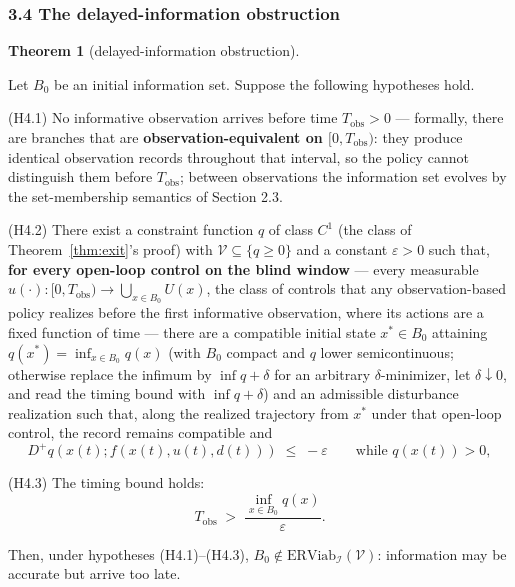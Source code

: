 \documentclass[11pt]{article}
\theoremstyle{definition}
\newtheorem{theorem}{Theorem}
\begin{document}
\subsubsection{3.4 The delayed-information
obstruction}\label{the-delayed-information-obstruction}

\begin{theorem}[delayed-information obstruction]\label{thm:delayed}

Let \(B_0\) be an initial information set. Suppose the following
hypotheses hold.

(H4.1) No informative observation arrives before time
\(T_{\mathrm{obs}} > 0\) --- formally, there are branches that are
\textbf{observation-equivalent on \([0, T_{\mathrm{obs}})\)}: they
produce identical observation records throughout that interval, so the
policy cannot distinguish them before \(T_{\mathrm{obs}}\); between
observations the information set evolves by the set-membership semantics
of Section 2.3.

(H4.2) There exist a constraint function \(q\) of class \(C^1\) (the
class of Theorem~\ref{thm:exit}'s proof) with \(\mathcal{V} \subseteq \{ q \ge 0 \}\)
and a constant \(\varepsilon > 0\) such that, \textbf{for every
open-loop control on the blind window} --- every measurable
\(u(\cdot) : [0, T_{\mathrm{obs}}) \to \bigcup_{x \in B_0} U(x)\), the
class of controls that any observation-based policy realizes before the
first informative observation, where its actions are a fixed function of
time --- there are a compatible initial state \(x^* \in B_0\) attaining
\(q(x^*) = \inf_{x \in B_0} q(x)\) (with \(B_0\) compact and \(q\) lower
semicontinuous; otherwise replace the infimum by \(\inf q + \delta\) for
an arbitrary \(\delta\)-minimizer, let \(\delta \downarrow 0\), and read
the timing bound with \(\inf q + \delta\)) and an admissible disturbance
realization such that, along the realized trajectory from \(x^*\) under
that open-loop control, the record remains compatible and
\[D^+ q(x(t); f(x(t), u(t), d(t))) \;\le\; -\varepsilon \qquad \text{while } q(x(t)) > 0, \tag{3}\]

(H4.3) The timing bound holds:
\[T_{\mathrm{obs}} \;>\; \frac{\inf_{x \in B_0} q(x)}{\varepsilon}. \tag{4}\]

Then, under hypotheses (H4.1)--(H4.3),
\(B_0 \notin \mathrm{ERViab}_{\mathcal{I}}(\mathcal{V})\): information
may be accurate but arrive too late.

\end{theorem}
\end{document}
